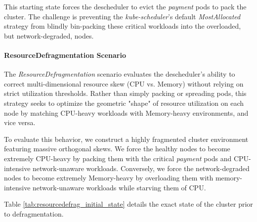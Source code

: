 This starting state forces the descheduler to evict the \textit{payment} pods to pack the cluster. The challenge is preventing the \textit{kube-scheduler}'s default \textit{MostAllocated} strategy from blindly bin-packing these critical workloads into the overloaded, but network-degraded, nodes.

\paragraph{ResourceDefragmentation Scenario}
\label{subsubsec:netaware4_workload_imbalance}
The \textit{ResourceDefragmentation} scenario evaluates the descheduler's ability to correct multi-dimensional resource skew (CPU vs. Memory) without relying on strict utilization thresholds. Rather than simply packing or spreading pods, this strategy seeks to optimize the geometric "shape" of resource utilization on each node by matching CPU-heavy workloads with Memory-heavy environments, and vice versa.

To evaluate this behavior, we construct a highly fragmented cluster environment featuring massive orthogonal skews. We force the healthy nodes to become extremely CPU-heavy by packing them with the critical \textit{payment} pods and CPU-intensive network-unaware workloads. Conversely, we force the network-degraded nodes to become extremely Memory-heavy by overloading them with memory-intensive network-unaware workloads while starving them of CPU.

Table \ref{tab:resourcedefrag_initial_state} details the exact state of the cluster prior to defragmentation.

\begin{table}[tbp]
    \centering
    \caption{Resource Allocation: Initial State for ResourceDefragmentation Strategy}
    \label{tab:resourcedefrag_initial_state}
\end{table}

